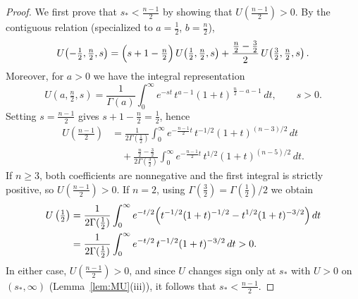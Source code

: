 \documentclass[11pt]{article}
\numberwithin{equation}{section}
\theoremstyle{definition}
\begin{document}
\begin{proof}
We first prove that $s_*<\frac{n-1}{2}$ by showing that $U\!\left(\frac{n-1}{2}\right)>0$.
By the contiguous relation \cite[Eq.~13.3.7]{DLMF} (specialized to $a=\tfrac12$, $b=\tfrac n2$),
\[
U\!\left(-\tfrac12,\tfrac n2,s\right)
=\Bigl(s+1-\tfrac n2\Bigr)\,U\!\left(\tfrac12,\tfrac n2,s\right)
+\frac{\tfrac n2-\tfrac32}{2}\,U\!\left(\tfrac32,\tfrac n2,s\right).
\]
Moreover, for $a>0$ we have the integral representation \cite[Eq.~13.4.4]{DLMF}
\[
U(a,\tfrac n2,s)=\frac{1}{\Gamma(a)}\int_{0}^{\infty}e^{-st}\,t^{a-1}(1+t)^{\,\tfrac n2-a-1}\,dt,
\qquad s>0.
\]
Setting $s=\frac{n-1}{2}$ gives $s+1-\tfrac n2=\tfrac12$, hence
\begin{align*}
U\!\left(\tfrac{n-1}{2}\right)
&=\frac{1}{2\Gamma(\tfrac12)}\int_{0}^{\infty}e^{-\frac{n-1}{2}t}\,t^{-1/2}(1+t)^{(n-3)/2}\,dt \\
&\quad+\frac{\tfrac n2-\tfrac32}{2\Gamma(\tfrac32)}
\int_{0}^{\infty}e^{-\frac{n-1}{2}t}\,t^{1/2}(1+t)^{(n-5)/2}\,dt .
\end{align*}
If $n\ge 3$, both coefficients are nonnegative and the first integral is strictly positive, so
$U\!\left(\frac{n-1}{2}\right)>0$. If $n=2$, using $\Gamma(\tfrac32)=\Gamma(\tfrac12)/2$ we obtain
\begin{align*}
    U \left(\tfrac12\right) & = \frac{1}{2\Gamma(\tfrac12)} \int_{0}^{\infty} e^{-t/2} \Bigl( t^{-1/2}(1+t)^{-1/2}-t^{1/2}(1+t)^{-3/2} \Bigr)\,dt \\
    & =\frac{1}{2\Gamma(\tfrac12)} \int_{0}^{\infty} e^{-t/2}\, t^{-1/2}(1+t)^{-3/2} \,dt>0.
\end{align*}
In either case, $U\!\left(\frac{n-1}{2}\right)>0$, and since $U$ changes sign only at $s_*$ with
$U>0$ on $(s_*,\infty)$ (Lemma~\ref{lem:MU}(iii)), it follows that $s_*<\frac{n-1}{2}$.


\end{proof}
\end{document}
